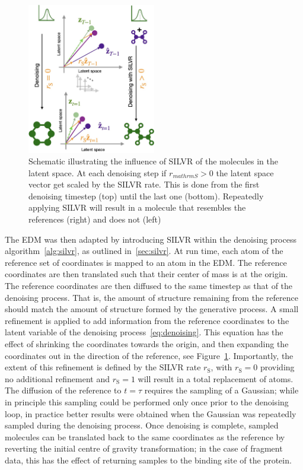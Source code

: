 \documentclass[journal=jacsat,manuscript=article]{achemso}
\begin{document}
\begin{figure}
    \centering
    \includegraphics[width=0.5\textwidth]{paper/Figures/Fig2/fig2.jpg}
    \caption{Schematic illustrating the influence of SILVR of the molecules in the latent space. At each denoising step if $r_{mathrm{S}}>0$ the latent space vector get scaled by the SILVR rate. This is done from the first denoising timestep (top) until the last one (bottom). Repeatedly applying SILVR will result in a molecule that resembles the references (right) and does not (left)}
    \label{fig:silvr_explanation}
\end{figure}

The EDM was then adapted by introducing SILVR within the denoising process algorithm~\ref{alg:silvr}, as outlined in~\ref{sec:silvr}. At run time, each atom of the reference set of coordinates is mapped to an atom in the EDM. The reference coordinates are then translated such that their center of mass is at the origin. The reference coordinates are then diffused to the same timestep as that of the denoising process. That is, the amount of structure remaining from the reference should match the amount of structure formed by the generative process. A small refinement is applied to add information from the reference coordinates to the latent variable of the denoising process~\ref{eq:denoising}. This equation has the effect of shrinking the coordinates towards the origin, and then expanding the coordinates out in the direction of the reference, see Figure~\ref{fig:silvr_explanation}. Importantly, the extent of this refinement is defined by the SILVR rate $r_{\mathrm{S}}$, with $r_{\mathrm{S}}=0$ providing no additional refinement and $r_{\mathrm{S}}=1$ will result in a total replacement of atoms. The diffusion of the reference to $t=\tau$ requires the sampling of a Gaussian; while in principle this sampling could be performed only once prior to the denoising loop, in practice better results were obtained when the Gaussian was repeatedly sampled during the denoising process. Once denoising is complete, sampled molecules can be translated back to the same coordinates as the reference by reverting the initial centre of gravity transformation; in the case of fragment data, this has the effect of returning samples to the binding site of the protein.
\end{document}
